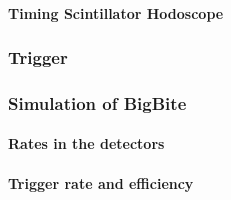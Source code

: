 \paragraph{Timing Scintillator Hodoscope}

\subsubsection{Trigger}

\subsubsection{Simulation of BigBite}

\paragraph{Rates in the detectors}

\paragraph{Trigger rate and efficiency}

